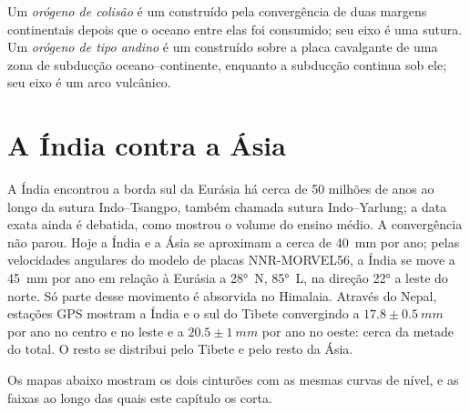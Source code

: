 \begin{definition}\label{def:b2:himalaya-andes:types}
Um \emph{orógeno de colisão} é um  construído pela convergência de
duas margens continentais depois que o oceano entre elas foi consumido; seu eixo é uma sutura.
Um \emph{orógeno de tipo andino} é um  construído sobre a placa
cavalgante de uma zona de subducção oceano--continente, enquanto a subducção continua sob ele; seu eixo
é um arco vulcânico.
\end{definition}


\section{A Índia contra a Ásia}\label{sec:b2:himalaya-andes:himalaya}

A Índia encontrou a borda sul da Eurásia há cerca de 50 milhões de anos ao longo da sutura
Indo--Tsangpo, também chamada sutura Indo--Yarlung; a data exata ainda é debatida, como
mostrou o volume do ensino médio. A convergência não parou. Hoje a Índia e a Ásia se aproximam
a cerca de \qty{40}{mm} por ano; pelas velocidades angulares do modelo de placas NNR-MORVEL56, a
Índia se move a \qty{45}{mm} por ano em relação à Eurásia a \ang{28}~N, \ang{85}~L, na direção
\ang{22} a leste do norte. Só parte desse movimento é absorvida no Himalaia. Através do Nepal,
estações GPS mostram a Índia e o sul do Tibete convergindo a $17.8 \pm \qty{0.5}{mm}$ por ano no
centro e no leste e a $20.5 \pm \qty{1}{mm}$ por ano no oeste: cerca da metade do total. O resto
se distribui pelo Tibete e pelo resto da Ásia.

Os mapas abaixo mostram os dois cinturões com as mesmas curvas de nível, e as faixas ao longo das quais este
capítulo os corta.

